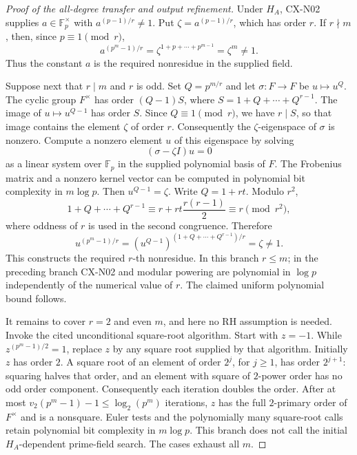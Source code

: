\documentclass[11pt,a4paper]{article}
\begin{document}
\begin{proof}[Proof of the all-degree transfer and output refinement]
Under $H_A$, CX-N02 supplies $a\in\mathbb F_p^\times$ with
$a^{(p-1)/r}\ne1$. Put $\zeta=a^{(p-1)/r}$, which has order $r$.
If $r\nmid m$, then, since $p\equiv1\pmod r$,
\[
 a^{(p^m-1)/r}
 =\zeta^{1+p+\cdots+p^{m-1}}
 =\zeta^m\ne1.
\]
Thus the constant $a$ is the required nonresidue in the supplied field.

Suppose next that $r\mid m$ and $r$ is odd. Set $Q=p^{m/r}$ and let
$\sigma:F\longrightarrow F$ be $u\longmapsto u^Q$.
The cyclic group $F^\times$ has order $(Q-1)S$, where
$S=1+Q+\cdots+Q^{r-1}$. The image of $u\mapsto u^{Q-1}$
has order $S$. Since $Q\equiv1\pmod r$, we have $r\mid S$,
so that image contains the element $\zeta$ of order $r$.
Consequently the $\zeta$-eigenspace of $\sigma$ is nonzero.
Compute a nonzero element $u$ of this eigenspace by solving
\[
 (\sigma-\zeta I)u=0
\]
as a linear system over $\mathbb F_p$ in the supplied polynomial
basis of $F$. The Frobenius matrix and a nonzero kernel vector can
be computed in polynomial bit complexity in $m\log p$.
Then $u^{Q-1}=\zeta$. Write $Q=1+rt$. Modulo $r^2$,
\[
 1+Q+\cdots+Q^{r-1}
 \equiv r+rt\frac{r(r-1)}2\equiv r\pmod{r^2},
\]
where oddness of $r$ is used in the second congruence. Therefore
\[
 u^{(p^m-1)/r}
 =\left(u^{Q-1}\right)^{(1+Q+\cdots+Q^{r-1})/r}
 =\zeta\ne1.
\]
This constructs the required $r$-th nonresidue. In this branch
$r\le m$; in the preceding branch CX-N02 and modular powering
are polynomial in $\log p$ independently of the numerical value
of $r$. The claimed uniform polynomial bound follows.

It remains to cover $r=2$ and even $m$, and here no RH assumption
is needed. Invoke the cited unconditional square-root algorithm.
Start with $z=-1$. While $z^{(p^m-1)/2}=1$, replace $z$ by any
square root supplied by that algorithm. Initially $z$ has order $2$.
A square root of an element of order $2^j$, for $j\ge1$, has order
$2^{j+1}$: squaring halves that order, and an element with square
of $2$-power order has no odd order component. Consequently each
iteration doubles the order. After at most
$v_2(p^m-1)-1\le\log_2(p^m)$ iterations, $z$ has the full
$2$-primary order of $F^\times$ and is a nonsquare. Euler tests and
the polynomially many square-root calls retain polynomial bit
complexity in $m\log p$. This branch does not call the initial
$H_A$-dependent prime-field search. The cases exhaust all $m$.
\end{proof}
\end{document}

